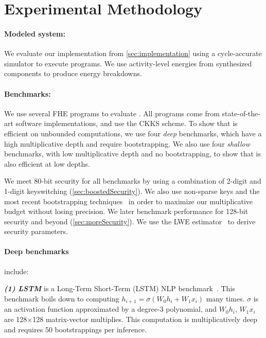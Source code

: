 \section{Experimental Methodology}\label{sec:methodology}

\paragraph{Modeled system:}
We evaluate our \name implementation from \autoref{sec:implementation}
using a cycle-accurate simulator to execute \name programs.
We use activity-level energies from synthesized components to produce energy breakdowns.

\paragraph{Benchmarks:}
We use several FHE programs to evaluate \name.
All programs come from state-of-the-art software implementations, and use the CKKS scheme.
To show that \name is efficient on unbounded computations,
we use four \emph{deep} benchmarks, which have a high multiplicative depth and require bootstrapping.
We also use four \emph{shallow} benchmarks,
with low multiplicative depth
and no bootstrapping, to show that \name is also efficient at low depths.

We meet 80-bit security for all benchmarks by using a combination of
2-digit and 1-digit keyswitching (\autoref{sec:boostedSecurity}). 
We also use non-sparse keys and the most recent bootstrapping techniques~\cite{bossuat2021efficient} in order to
maximize our multiplicative budget without losing precision.
We later
benchmark performance for 128-bit security and beyond (\autoref{sec:moreSecurity}).
We use the LWE estimator~\cite{albrecht2018estimate} to derive security parameters.

\paragraph{Deep benchmarks} include:

\noindent \emph{\textbf{(1) LSTM}} is a Long-Term Short-Term (LSTM) NLP 
benchmark~\cite{podschwadt:2020:classification}. 
This benchmark boils down to computing $h_{i+1} = \sigma(W_0h_i + W_1x_i)$ many times. 
$\sigma$ is an activation function approximated by a degree-3 polynomial, and 
$W_0h_i$, $W_1x_i$ are 128$\times$128 matrix-vector multiplies. 
This computation is multiplicatively deep and requires 50 bootstrappings per inference. 

